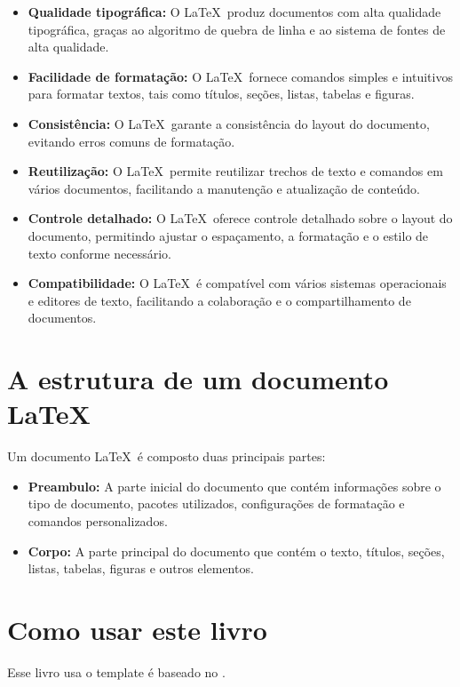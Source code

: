 \begin{itemize}
    \item \textbf{Qualidade tipográfica:} O \LaTeX\ produz documentos com alta qualidade tipográfica, graças ao algoritmo de quebra de linha e ao sistema de fontes de alta qualidade.
    \item \textbf{Facilidade de formatação:} O \LaTeX\ fornece comandos simples e intuitivos para formatar textos, tais como títulos, seções, listas, tabelas e figuras.
    \item \textbf{Consistência:} O \LaTeX\ garante a consistência do layout do documento, evitando erros comuns de formatação.
    \item \textbf{Reutilização:} O \LaTeX\ permite reutilizar trechos de texto e comandos em vários documentos, facilitando a manutenção e atualização de conteúdo.
    \item \textbf{Controle detalhado:} O \LaTeX\ oferece controle detalhado sobre o layout do documento, permitindo ajustar o espaçamento, a formatação e o estilo de texto conforme necessário.
    \item \textbf{Compatibilidade:} O \LaTeX\ é compatível com vários sistemas operacionais e editores de texto, facilitando a colaboração e o compartilhamento de documentos.

\end{itemize}

\section{A estrutura de um documento \LaTeX}

Um documento \LaTeX\ é composto duas principais partes:

\begin{itemize}
    \item \textbf{Preambulo:} A parte inicial do documento que contém informações sobre o tipo de documento, pacotes utilizados, configurações de formatação e comandos personalizados.
    \item \textbf{Corpo:} A parte principal do documento que contém o texto, títulos, seções, listas, tabelas, figuras e outros elementos.
\end{itemize}


\section{Como usar este livro}

Esse livro usa o template \'e baseado no \cite{carauma}.



